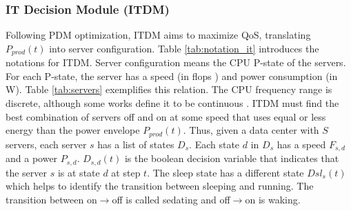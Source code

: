 



\subsubsection{IT Decision Module (ITDM)}

Following PDM optimization, ITDM aims to maximize QoS, translating $P_{prod}(t)$ into server configuration. Table \ref{tab:notation_it} introduces the notations for ITDM. Server configuration means the CPU P-state of the servers. For each P-state, the server has a speed (in flops \cite{hunger2005floating}) and power consumption (in W). Table \ref{tab:servers} exemplifies this relation. The CPU frequency range is discrete, although some works define it to be continuous \cite{saha2012experimental}. ITDM must find the best combination of servers off and on at some speed that uses equal or less energy than the power envelope $P_{prod}(t)$. Thus, given a data center with $S$ servers, each server $s$ has a list of states $D_s$. Each state $d$ in $D_s$ has a speed $F_{s,d}$ and a power $P_{s,d}$. $D_{s,d}(t)$ is the boolean decision variable that indicates that the server $s$ is at state $d$ at step $t$. The sleep state has a different state $Dsl_{s}(t)$ which helps to identify the transition between sleeping and running. The transition between on$\rightarrow$off is called sedating and off$\rightarrow$on is waking.


